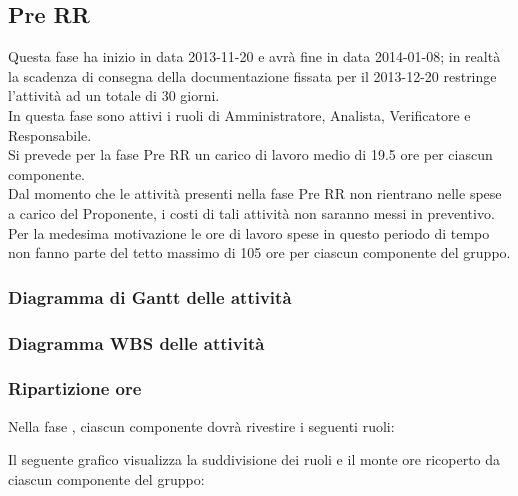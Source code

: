 \subsection{Pre RR}
Questa fase ha inizio in data 2013-11-20 e avrà fine in data 2014-01-08; in realtà la scadenza di consegna della documentazione fissata per il 2013-12-20 restringe l'attività ad un totale di 30 giorni.\\
In questa fase sono attivi i ruoli di Amministratore, Analista, Verificatore e Responsabile.\\
Si prevede per la fase Pre RR un carico di lavoro medio di 19.5 ore per ciascun componente.\\
Dal momento che le attività presenti nella fase Pre RR non rientrano nelle spese a carico del Proponente, i costi di tali attività non saranno messi in preventivo.\\
Per la medesima motivazione le ore di lavoro spese in questo periodo di tempo non fanno parte del tetto massimo di 105 ore per ciascun componente del gruppo.

\subsubsection{Diagramma di Gantt delle attività}

\newpage
\subsubsection{Diagramma WBS delle attività}

\newpage
\subsubsection{Ripartizione ore}

\newpage
Nella fase , ciascun componente dovrà rivestire i seguenti ruoli:

Il seguente grafico visualizza la suddivisione dei ruoli e il monte ore ricoperto da ciascun componente del gruppo:

